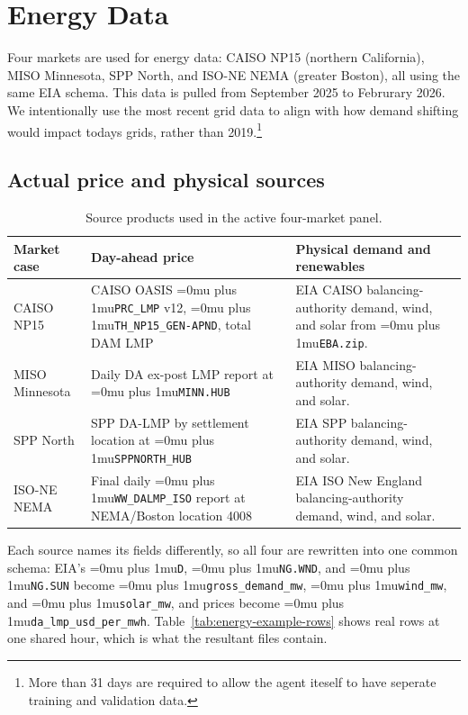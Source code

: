 \documentclass[conference]{IEEEtran}
\newcommand{\codepath}[1]{{\Urlmuskip=0mu plus 1mu\relax\nolinkurl{#1}}}
\begin{document}
\section{Energy Data}
\label{sec:energy-data}

Four markets are used for energy data: CAISO NP15 (northern California), MISO Minnesota, SPP North, and ISO-NE NEMA (greater Boston), all using the same EIA schema. This data is pulled from September 2025 to Februrary 2026. We intentionally use the most recent grid data to align with how demand shifting would impact todays grids, rather than 2019.\footnote{More than 31 days are required to allow the agent iteself to have seperate training and validation data.}

\subsection{Actual price and physical sources}
\label{subsec:energy-sources}

\begin{table}[t]
  \centering
  \small
  \caption{Source products used in the active four-market panel.}
  \label{tab:energy-sources}
  \begin{tabular}{@{}L{0.14\textwidth}L{0.37\textwidth}L{0.41\textwidth}@{}}
  \toprule
  Market case & Day-ahead price & Physical demand and renewables \\
  \midrule
  CAISO NP15
    & CAISO OASIS \codepath{PRC_LMP} v12,
      \codepath{TH_NP15_GEN-APND}, total DAM LMP
      \cite{caisoOasis}
    & EIA CAISO balancing-authority demand, wind, and solar from
      \codepath{EBA.zip}. \\
  MISO Minnesota
    & Daily DA ex-post LMP report at \codepath{MINN.HUB}
      \cite{misoReports}
    & EIA MISO balancing-authority demand, wind, and solar. \\
  SPP North
    & SPP DA-LMP by settlement location at
      \codepath{SPPNORTH_HUB} \cite{sppPublicData}
    & EIA SPP balancing-authority demand, wind, and solar. \\
  ISO-NE NEMA
    & Final daily \codepath{WW_DALMP_ISO} report at NEMA/Boston location 4008
      \cite{isoneReports}
    & EIA ISO New England balancing-authority demand, wind, and solar. \\
  \bottomrule
  \end{tabular}
\end{table}

Each source names its fields differently, so all four are rewritten into one common schema: EIA's \codepath{D}, \codepath{NG.WND}, and \codepath{NG.SUN} become \codepath{gross_demand_mw}, \codepath{wind_mw}, and \codepath{solar_mw}, and prices become \codepath{da_lmp_usd_per_mwh}. Table~\ref{tab:energy-example-rows} shows real rows at one shared hour, which is what the resultant files contain. 
\end{document}
